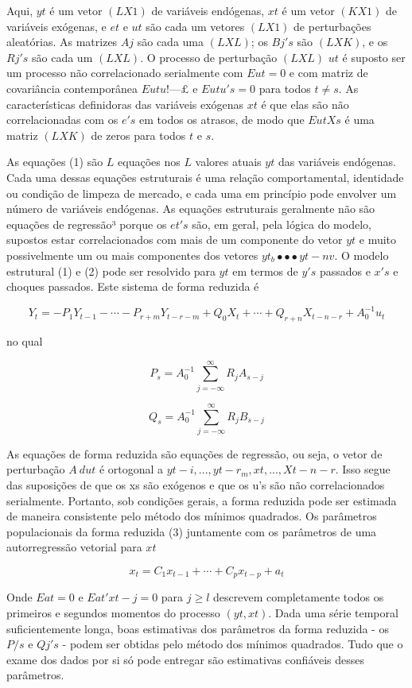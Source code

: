 \documentclass[a4paper,12pt]{article}[abntex2]
\begin{document}
Aqui, $yt$ é um vetor $(LX1)$ de variáveis endógenas, $xt$ é um vetor $(KX1)$ de variáveis exógenas, e $et$ e $ut$ são cada um vetores $(LX1)$ de perturbações aleatórias. As matrizes $Aj$ são cada uma $(LXL)$; os $Bj's$ são $(LXK)$, e os $Rj's$ são cada um $(LXL)$. O processo de perturbação $(LXL)$ $ut$ é suposto ser um processo não correlacionado serialmente com $Eut = 0$ e com matriz de covariância contemporânea $Eutu! — £$ e $Eutu's = 0$ para todos $t ≠ s$. As características definidoras das variáveis exógenas $xt$ é que elas são não correlacionadas com os $e's$ em todos os atrasos, de modo que $EutXs$ é uma matriz $(LXK)$ de zeros para todos $t$ e $s$.

As equações (1) são $L$ equações nos $L$ valores atuais $yt$ das variáveis endógenas. Cada uma dessas equações estruturais é uma relação comportamental, identidade ou condição de limpeza de mercado, e cada uma em princípio pode envolver um número de variáveis endógenas. As equações estruturais geralmente não são equações de regressão³ porque os $et's$ são, em geral, pela lógica do modelo, supostos estar correlacionados com mais de um componente do vetor $yt$ e muito possivelmente um ou mais componentes dos vetores $yt_ b • • • yt-nv$. O modelo estrutural (1) e (2) pode ser resolvido para $yt$ em termos de $y's$ passados e $x's$ e choques passados. Este sistema de forma reduzida é

\begin{equation}
    Y_t = -P_1 Y_{t-1} - \cdots - P_{r+m} Y_{t-r-m} + Q_0 X_t + \cdots + Q_{r+n} X_{t-n-r} + A_0^{-1} u_t
\end{equation}

no qual 

\[
P_s = A_0^{-1} \sum_{j=-\infty}^{\infty} R_j A_{s-j}
\]

\[
Q_s = A_0^{-1} \sum_{j=-\infty}^{\infty} R_j B_{s-j}
\]

As equações de forma reduzida são equações de regressão, ou seja, o vetor de perturbação $A~dut$ é ortogonal a $yt- i , ..., yt-r_m,xt , ..., Xt-n-r$. Isso segue das suposições de que os xs são exógenos e que os u's são não correlacionados serialmente. Portanto, sob condições gerais, a forma reduzida pode ser estimada de maneira consistente pelo método dos mínimos quadrados. Os parâmetros populacionais da forma reduzida (3) juntamente com os parâmetros de uma autorregressão vetorial para $xt$

\[
x_t = C_1 x_{t-1} + \cdots + C_p x_{t-p} + a_t
\]

Onde $Eat = 0$ e $Ea t' x t-j = 0$ para $j \geq l$ descrevem completamente todos os primeiros e segundos momentos do processo $(yt, xt)$. Dada uma série temporal suficientemente longa, boas estimativas dos parâmetros da forma reduzida - os $P/s$ e $Qj's$ - podem ser obtidas pelo método dos mínimos quadrados. Tudo que o exame dos dados por si só pode entregar são estimativas confiáveis desses parâmetros.
\end{document}
